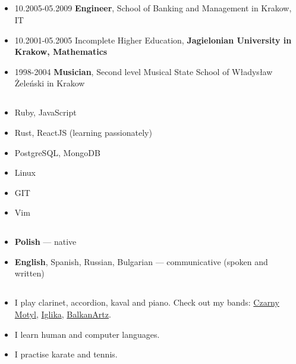 \documentclass[a4paper]{article}
\begin{document}
\subsection*{}
\begin{itemize}
  \item
    10.2005-05.2009 \textbf{Engineer}, School of Banking and Management in Krakow, IT

  \item
    10.2001-05.2005 Incomplete Higher Education,
    \textbf{Jagielonian University in Krakow, Mathematics}

  \item
    1998-2004 \textbf{Musician},
    Second level Musical State School of Władysław Żeleński in Krakow
\end{itemize}

\subsection*{}
\begin{itemize}
\item
  Ruby, JavaScript
\item
  Rust, ReactJS (learning passionately)
\item
  PostgreSQL, MongoDB
\item
  Linux
\item
  GIT
\item
  Vim
\end{itemize}

\subsection*{}
\begin{itemize}
\item
  \textbf{Polish} --- native
\item
  \textbf{English}, Spanish, Russian, Bulgarian --- communicative (spoken and written)
\end{itemize}

\subsection*{}
\begin{itemize}
\item
	I play clarinet, accordion, kaval and piano. Check out my bands: \href{https://soundcloud.com/czarny-motyl}{Czarny Motyl}, \href{https://soundcloud.com/iglika-pl}{Iglika}, \href{https://soundcloud.com/user-919481466}{BalkanArtz}.
\item
  I learn human and computer languages.
\item
  I practise karate and tennis.
\end{itemize}
\end{document}

